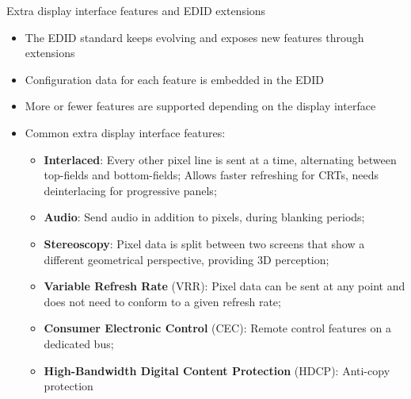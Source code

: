 \begin{frame}{Extra display interface features and EDID extensions}
  \begin{itemize}
  \item The EDID standard keeps evolving and exposes new features through extensions
  \item Configuration data for each feature is embedded in the EDID
  \item More or fewer features are supported depending on the display interface
  \item Common extra display interface features:
    \begin{itemize}
    \item \textbf{Interlaced}: Every other pixel line is sent at a time, alternating between top-fields and bottom-fields; Allows faster refreshing for CRTs, needs deinterlacing for progressive panels;
    \item \textbf{Audio}: Send audio in addition to pixels, during blanking periods;
    \item \textbf{Stereoscopy}: Pixel data is split between two screens that show a different geometrical perspective, providing 3D perception;
    \item \textbf{Variable Refresh Rate} (VRR): Pixel data can be sent at any point and does not need to conform to a given refresh rate;
    \item \textbf{Consumer Electronic Control} (CEC): Remote control features on a dedicated bus;
    \item \textbf{High-Bandwidth Digital Content Protection} (HDCP): Anti-copy protection
    \end{itemize}
  \end{itemize}
\end{frame}

